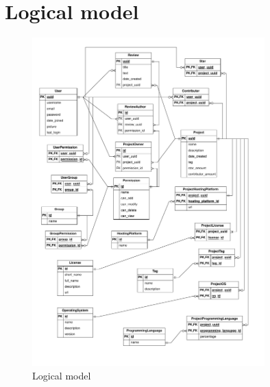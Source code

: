 \pagebreak
\section{Logical model}

\begin{figure}[h]
  \centering
  \includegraphics[width=0.8\textwidth]{./TeX-files/ERD/logical-model.pdf}
  \caption{Logical model}
  \label{fig:ERD}
\end{figure}
